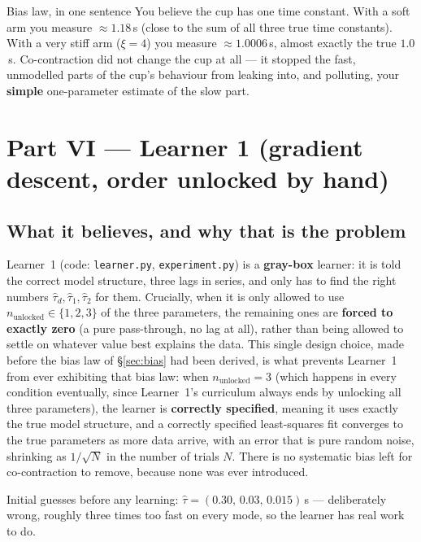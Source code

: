 \documentclass[11pt,a4paper]{article}
\begin{document}
\begin{examplebox}{Bias law, in one sentence}
You believe the cup has one time constant. With a soft arm you measure
$\approx1.18$\,s (close to the sum of all three true time constants). With a
very stiff arm ($\xi=4$) you measure $\approx1.0006$\,s, almost exactly the
true $1.0$\,s. Co-contraction did not change the cup at all --- it stopped the
fast, unmodelled parts of the cup's behaviour from leaking into, and
polluting, your \textbf{simple} one-parameter estimate of the slow part.
\end{examplebox}

\section{Part VI --- Learner 1 (gradient descent, order unlocked by hand)}
\label{sec:learner1}

\subsection{What it believes, and why that is the problem}

Learner~1 (code: \texttt{learner.py}, \texttt{experiment.py}) is a
\textbf{gray-box} learner: it is told the correct model structure, three lags
in series, and only has to find the right numbers $\hat\tau_d,\hat\tau_1,\hat\tau_2$
for them. Crucially, when it is only allowed to use $n_{\mathrm{unlocked}}\in\{1,2,3\}$
of the three parameters, the remaining ones are \textbf{forced to exactly zero}
(a pure pass-through, no lag at all), rather than being allowed to settle on
whatever value best explains the data. This single design choice, made before
the bias law of \S\ref{sec:bias} had been derived, is what prevents
Learner~1 from ever exhibiting that bias law: when $n_{\mathrm{unlocked}}=3$
(which happens in every condition eventually, since Learner~1's curriculum
always ends by unlocking all three parameters), the learner is
\textbf{correctly specified}, meaning it uses exactly the true model structure,
and a correctly specified least-squares fit converges to the true parameters
as more data arrive, with an error that is pure random noise, shrinking as
$1/\sqrt{N}$ in the number of trials $N$. There is no systematic bias left for
co-contraction to remove, because none was ever introduced.

Initial guesses before any learning: $\hat\tau=(0.30,\,0.03,\,0.015)$\,s ---
deliberately wrong, roughly three times too fast on every mode, so the learner
has real work to do.
\end{document}
